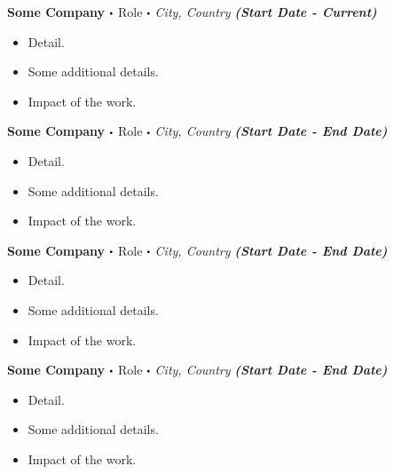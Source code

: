 \documentclass[10pt]{article}
\newcommand\sbullet[1][.5]{\mathbin{\vcenter{\hbox{\scalebox{#1}{$\bullet$}}}}}
\begin{document}
  \textbf{\large Some Company $\sbullet$} {\large Role $\sbullet$ \textit{City, Country} \hfill \textit{\textbf{(Start Date - Current)}}}

  \vspace*{-0.2cm}
  \begin{itemize}
    \itemsep-0.4em
    \item \textcolor{lighterG}{Detail.}
    \item \textcolor{lighterG}{Some additional details.}
    \item \textcolor{lighterG}{Impact of the work.}
  \end{itemize}

  \textbf{\large Some Company $\sbullet$} {\large Role $\sbullet$ \textit{City, Country} \hfill \textit{\textbf{(Start Date - End Date)}}}

  \vspace*{-0.2cm}
  \begin{itemize}
    \itemsep-0.4em
    \item \textcolor{lighterG}{Detail.}
    \item \textcolor{lighterG}{Some additional details.}
    \item \textcolor{lighterG}{Impact of the work.}
  \end{itemize}

  \textbf{\large Some Company $\sbullet$} {\large Role $\sbullet$ \textit{City, Country} \hfill \textit{\textbf{(Start Date - End Date)}}}

  \vspace*{-0.2cm}
  \begin{itemize}
    \itemsep-0.4em
    \item \textcolor{lighterG}{Detail.}
    \item \textcolor{lighterG}{Some additional details.}
    \item \textcolor{lighterG}{Impact of the work.}
  \end{itemize}

  \textbf{\large Some Company $\sbullet$} {\large Role $\sbullet$ \textit{City, Country} \hfill \textit{\textbf{(Start Date - End Date)}}}

  \vspace*{-0.2cm}
  \begin{itemize}
    \itemsep-0.4em
    \item \textcolor{lighterG}{Detail.}
    \item \textcolor{lighterG}{Some additional details.}
    \item \textcolor{lighterG}{Impact of the work.}
  \end{itemize}
\end{document}

